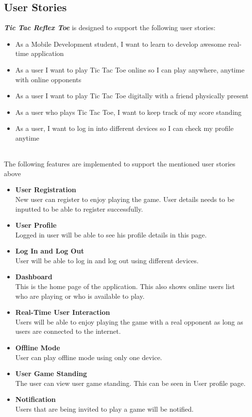 \documentclass{article}
\begin{document}
    \subsection{User Stories}
    \textbf{\emph{Tic Tac Reflex Toe}} is designed to support the following user stories:
    \begin{itemize}
        \item As a Mobile Development student, I want to learn to develop awesome real-time application
        \item As a user I want to play Tic Tac Toe online so I can play anywhere, anytime with online opponents
        \item As a user I want to play Tic Tac Toe digitally with a friend physically present
        \item As a user who plays Tic Tac Toe, I want to keep track of my score standing
        \item As a user, I want to log in into different devices so I can check my profile anytime
    \end{itemize}
    ~\\
    The following features are implemented to support the mentioned user stories above
    \begin{itemize}
    	\item \textbf{User Registration}\\
    	New user can register to enjoy playing the game.  User details needs to be inputted to be able to register successfully.
    	\item \textbf{User Profile}\\
    	Logged in user will be able to see his profile details in this page.
    	\item \textbf{Log In and Log Out}\\
    	User will be able to log in and log out using different devices.
    	\item \textbf{Dashboard}\\
    	This is the home page of the application.  This also shows online users list who are playing or who is available to play.
    	\item \textbf{Real-Time User Interaction}\\
    	Users will be able to enjoy playing the game with a real opponent as long as users are connected to the internet.
    	\item \textbf{Offline Mode}\\ 
    	User can play offline mode using only one device.
    	\item \textbf{User Game Standing}\\
    	The user can view user game standing.  This can be seen in User profile page.
    	\item \textbf{Notification}\\
    	Users that are being invited to play a game will be notified.
    \end{itemize}
    ~\newline
\end{document}
